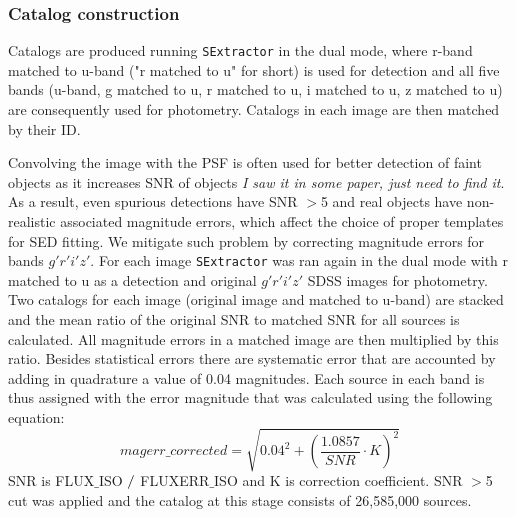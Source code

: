 \documentclass[apj,iop]{emulateapj}
\begin{document}
\subsubsection{Catalog construction}

Catalogs are produced running {\tt SExtractor} in the dual mode, where r-band matched to u-band ("r matched to u" for short) is used for detection and all five bands (u-band, g matched to u, r matched to u, i matched to u, z matched to u) are consequently used for photometry. Catalogs in each image are then matched by their ID.

Convolving the image with the PSF is often used for better detection of faint objects as it increases SNR of objects \textit{I saw it in some paper, just need to find it}. As a result, even spurious detections have SNR $>$5 and real objects have non-realistic associated magnitude errors, which affect the choice of proper templates for SED fitting. We mitigate such problem by correcting magnitude errors for bands $g'r'i'z'$. For each image {\tt SExtractor} was ran again in the dual mode with r matched to u as a detection and original $g'r'i'z'$ SDSS images for photometry. Two catalogs for each image (original image and matched to u-band) are stacked and the mean ratio of the original SNR to matched SNR for all sources is calculated. All magnitude errors in a matched image are then multiplied by this ratio. Besides statistical errors there are systematic error that are accounted by adding in quadrature a value of 0.04 magnitudes. Each source in each band is thus assigned with the error magnitude that was calculated using the following equation:
$$ magerr\_corrected = \sqrt{0.04^{2}+(\dfrac{1.0857}{SNR}\cdot K)^{2}} $$ SNR is FLUX$\_$ISO $ \//$ FLUXERR$\_$ISO and K is correction coefficient. SNR $>$5 cut was applied and the catalog at this stage consists of 26,585,000 sources. 
\end{document}
